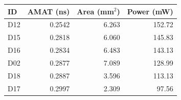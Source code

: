 \begin{tabular}{lrrr}\toprule
ID & AMAT (ns) & Area (mm$^2$) & Power (mW) \\ \midrule
D12 & 0.2542 & 6.263 & 152.72 \\
D15 & 0.2818 & 6.060 & 145.83 \\
D16 & 0.2834 & 6.483 & 143.13 \\
D02 & 0.2877 & 7.089 & 128.99 \\
D18 & 0.2887 & 3.596 & 113.13 \\
D17 & 0.2997 & 2.309 & 97.56 \\
\bottomrule\end{tabular}
